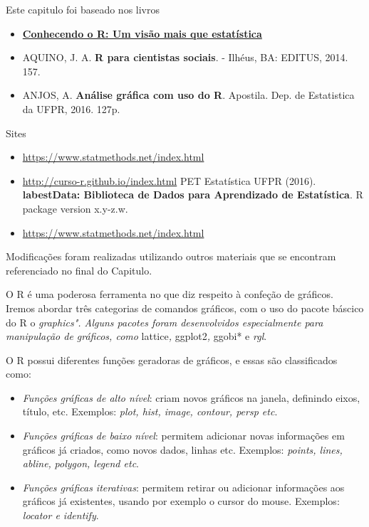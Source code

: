 \documentclass[]{book}
\begin{document}
Este capitulo foi baseado nos livros

\begin{itemize}
\item
  \href{https://www.editoraufv.com.br/produto/conhecendo-o-r-uma-visao-mais-que-estatistica/1109294}{\textbf{Conhecendo o R: Um visão mais que estatística}}
\item
  AQUINO, J. A. \textbf{R para cientistas sociais}. - Ilhéus, BA: EDITUS, 2014. 157.
\item
  ANJOS, A. \textbf{Análise gráfica com uso do R}. Apostila. Dep. de Estatistica da UFPR, 2016. 127p.
\end{itemize}

Sites

\begin{itemize}
\item
  \url{https://www.statmethods.net/index.html}
\item
  \url{http://curso-r.github.io/index.html} PET Estatística UFPR (2016). \textbf{labestData: Biblioteca de Dados para Aprendizado de Estatística}. R package version x.y-z.w.
\item
  \url{https://www.statmethods.net/index.html}
\end{itemize}

Modificações foram realizadas utilizando outros materiais que se encontram referenciado no final do Capitulo.

O R é uma poderosa ferramenta no que diz respeito à confeção de gráficos. Iremos abordar três categorias de comandos gráficos, com o uso do pacote báscico do R o \emph{graphics". Alguns pacotes foram desenvolvidos especialmente para manipulação de gráficos, como
}lattice\emph{, }ggplot2\emph{, }ggobi* e \emph{rgl}.

O R possui diferentes funções geradoras de gráficos, e essas são classificados como:

\begin{itemize}
\item
  \emph{Funções gráficas de alto nível}: criam novos gráficos na janela, definindo eixos, título, etc. Exemplos: \emph{plot, hist, image, contour, persp etc}.
\item
  \emph{Funções gráficas de baixo nível}: permitem adicionar novas informações em gráficos já criados, como novos dados, linhas etc. Exemplos: \emph{points, lines, abline,} \emph{polygon, legend etc}.
\item
  \emph{Funções gráficas iterativas}: permitem retirar ou adicionar informações aos gráficos já existentes, usando por exemplo o cursor do mouse. Exemplos: \emph{locator e identify}.
\end{itemize}
\end{document}
